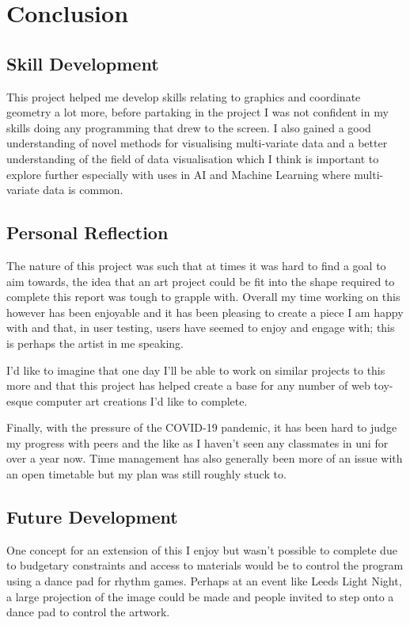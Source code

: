 \chapter{Conclusion}
\section{Skill Development}
This project helped me develop skills relating to graphics and coordinate
geometry a lot more, before partaking in the project I was not confident in my
skills doing any programming that drew to the screen. I also gained a good
understanding of novel methods for visualising multi-variate data and a better
understanding of the field of data visualisation which I think is important to
explore further especially with uses in AI and Machine Learning where
multi-variate data is common.

\section{Personal Reflection}
The nature of this project was such that at times it was hard to find a goal to
aim towards, the idea that an art project could be fit into the shape
required to complete this report was tough to grapple with. Overall my time
working on this however has been enjoyable and it has been pleasing to create a
piece I am happy with and that, in user testing, users have seemed to enjoy and
engage with; this is perhaps the artist in me speaking. 

I'd like to imagine that one day I'll be able to work on similar projects to
this more and that this project has helped create a base for any number of
web toy-esque computer art creations I'd like to complete.

Finally, with the pressure of the COVID-19 pandemic, it has been hard to judge my
progress with peers and the like as I haven't seen any classmates in uni for
over a year now. Time management has also generally been more of an issue with
an open timetable but my plan was still roughly stuck to.

\section{Future Development}
One concept for an extension of this I enjoy but wasn't possible to complete due
to budgetary constraints and access to materials would be to control the program
using a dance pad for rhythm games. Perhaps at an event like Leeds Light Night, a
large projection of the image could be made and people invited to step onto a
dance pad to control the artwork.

